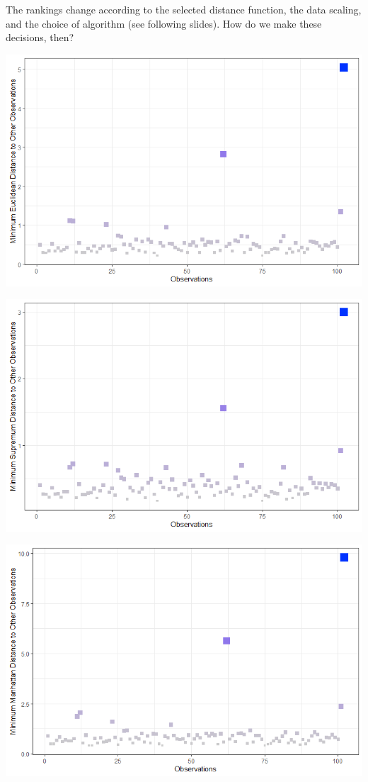\documentclass[20pt,landscape,footrule,headrule]{foils}
\newcommand{\newl}{\newline\newline}
\begin{document}
The rankings change according to the selected distance function, the data scaling, and the choice of algorithm (see following slides). \newl How do we make these decisions, then?   
\newpage
\begin{center}
\includegraphics[width=\textwidth]{Images/AD_L2_min}
\end{center}
\newpage
\begin{center}
\includegraphics[width=\textwidth]{Images/AD_L0_min}
\end{center}
\newpage
\begin{center}
\includegraphics[width=\textwidth]{Images/AD_L1_min}
\end{center}
\end{document}
